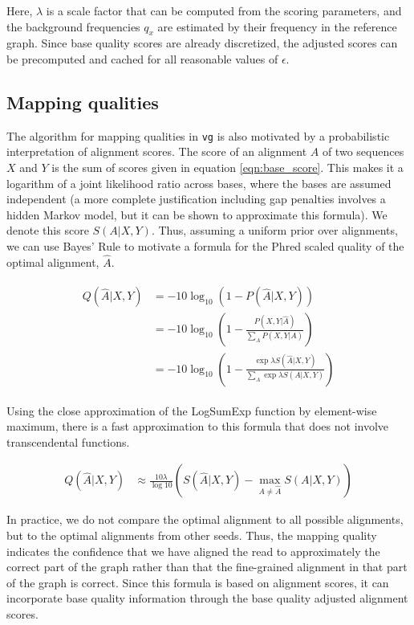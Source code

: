 Here, $\lambda$ is a scale factor that can be computed from the scoring parameters, and the background frequencies $q_x$ are estimated by their frequency in the reference graph. Since base quality scores are already discretized, the adjusted scores can be precomputed and cached for all reasonable values of $\epsilon$. 

\subsection{Mapping qualities}

The algorithm for mapping qualities in {\tt vg} is also motivated by a probabilistic interpretation of alignment scores.
The score of an alignment $A$ of two sequences $X$ and $Y$ is the sum of scores given in equation \ref{eqn:base_score}.
This makes it a logarithm of a joint likelihood ratio across bases, where the bases are assumed independent (a more complete justification including gap penalties involves a hidden Markov model, but it can be shown to approximate this formula).
We denote this score $S(A|X,Y)$.
Thus, assuming a uniform prior over alignments, we can use Bayes' Rule to motivate a formula for the Phred scaled quality of the optimal alignment, $\hat A$.

\begin{align}
\begin{split}
    Q(\hat A|X,Y) &= -10\log_{10}(1 - P(\hat A|X,Y)) \\
    &= -10 \log_{10}\left(1 - \frac{P(X,Y|\hat A)}{\sum_{A}P(X,Y|A)} \right) \\
    &= -10 \log_{10}\left(1 - \frac{\exp \lambda S(\hat A|X,Y)}{\sum_{A}\exp \lambda S(A|X,Y)} \right) \label{basicqualityscore}
\end{split}
\end{align}

Using the close approximation of the LogSumExp function by element-wise maximum, there is a fast approximation to this formula that does not involve transcendental functions.

\begin{align}
    Q(\hat A|X,Y) &\approx \frac{10\lambda}{\log 10}\left( S(\hat A | X,Y) - \max_{A \neq \hat A}S(A| X,Y)\right)
\end{align}

In practice, we do not compare the optimal alignment to all possible alignments, but to the optimal alignments from other seeds. Thus, the mapping quality indicates the confidence that we have aligned the read to approximately the correct part of the graph rather than that the fine-grained alignment in that part of the graph is correct. Since this formula is based on alignment scores, it can incorporate base quality information through the base quality adjusted alignment scores.


